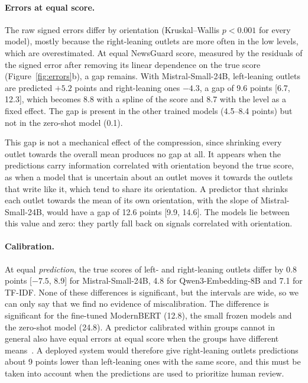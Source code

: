 \documentclass[11pt,a4paper]{article}
\begin{document}
\paragraph{Errors at equal score.} The raw signed errors differ by orientation (Kruskal--Wallis $p < 0.001$ for every
model), mostly because the right-leaning outlets are more often in the low levels, which are overestimated. At equal
NewsGuard score, measured by the residuals of the signed error after removing its linear dependence on the true score
(Figure~\ref{fig:errors}b), a gap remains. With Mistral-Small-24B, left-leaning outlets are predicted $+5.2$ points and
right-leaning ones $-4.3$, a gap of 9.6 points [6.7, 12.3], which becomes 8.8 with a spline of the score and 8.7 with the
level as a fixed effect. The gap is present in the other trained models (4.5--8.4 points) but not in the zero-shot model
(0.1).

This gap is not a mechanical effect of the compression, since shrinking every outlet towards the overall mean produces
no gap at all. It appears when the predictions carry information correlated with orientation beyond the true score, as
when a model that is uncertain about an outlet moves it towards the outlets that write like it, which tend to share its
orientation. A predictor that shrinks each outlet towards the mean of its own orientation, with the slope of
Mistral-Small-24B, would have a gap of 12.6 points [9.9, 14.6]. The models lie between this value and zero: they partly fall back on signals correlated with orientation.

\paragraph{Calibration.} At equal \emph{prediction}, the true scores of left- and right-leaning outlets differ by 0.8
points [$-7.5$, 8.9] for Mistral-Small-24B, 4.8 for Qwen3-Embedding-8B and 7.1 for TF-IDF. None of these differences is
significant, but the intervals are wide, so we can only say that we find no evidence of miscalibration. The difference
is significant for the fine-tuned ModernBERT (12.8), the small frozen models and the zero-shot model (24.8). A predictor
calibrated within groups cannot in general also have equal errors at equal score when the groups have different
means~\cite{kleinberg2017inherent,chouldechova2017fair}. A deployed system would therefore give right-leaning outlets
predictions about 9 points lower than left-leaning ones with the same score, and this must be taken into account when the
predictions are used to prioritize human review.
\end{document}
